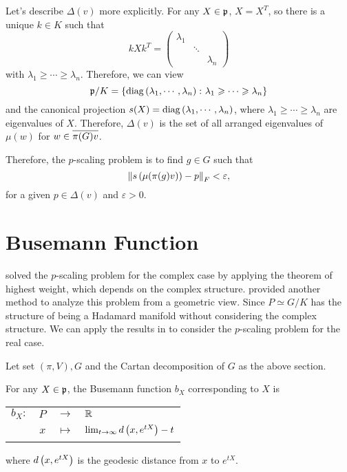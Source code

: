 \documentclass[suri,pdfbookmark]{engsuribt} %
\begin{document}
  Let's describe $\Delta(v)$ more explicitly. For any $X \in \mathfrak{p}$, $X = X^T$, so there is a unique $k \in K$ such that
  \begin{equation*}
    kXk^T = \left(
            \begin{array}{ccc}
              \lambda_1 & & \\
              & \ddots &\\
              &&\lambda_n
            \end{array}
          \right)
  \end{equation*}
  with $\lambda_1 \geqslant \cdots \geqslant \lambda_n$. Therefore, we can view
  \begin{equation*}
    \mathfrak{p}/K = \left\{\operatorname{diag}\left(\lambda_1, \cdots, \lambda_n\right) \colon \lambda_1 \geqslant \cdots \geqslant \lambda_n\right\}
  \end{equation*}
  and the canonical projection $s(X)= \operatorname{diag}\left(\lambda_1, \cdots, \lambda_n\right)$, where $\lambda_1 \geqslant \cdots \geqslant \lambda_n$ are eigenvalues of $X$. Therefore, $\Delta(v)$ is the set of all arranged eigenvalues of $\mu(w)$ for $w \in \overline{\pi(G)v}$.

  Therefore, the $p$-scaling problem is to find $g \in G$ such that
  \begin{equation*}
    \left\lVert s\left(\mu(\pi(g)v)\right)-p\right\lVert_{F} < \varepsilon,
  \end{equation*}
  for a given $p \in \Delta(v)$ and $\varepsilon > 0$.

  \section{Busemann Function}

  \cite{key8} solved the $p$-scaling problem for the complex case by applying the theorem of highest weight, which depends on the complex structure. \cite{key12} provided another method to analyze this problem from a geometric view. Since $P \simeq G/K$ has the structure of being a Hadamard manifold without considering the complex structure. We can apply the results in \cite{key12} to consider the $p$-scaling problem for the real case.

  Let set $(\pi,V),G$ and the Cartan decomposition of $G$ as the above section.

  \begin{defn}
    For any $X \in \mathfrak{p}$, the Busemann function $b_X$ corresponding to $X$ is
    \begin{center}
      \begin{tabular}{rrcl}
        $b_X \colon$ & $P$ & $\longrightarrow$ & $\mathbb{R}$\\
        ~ & $x$ & $\longmapsto$ & $\lim_{t \rightarrow \infty}d\left(x,e^{tX}\right)-t$
      \end{tabular}
    \end{center}
    where $d\left(x,e^{tX}\right)$ is the geodesic distance from $x$ to $e^{tX}$.
  \end{defn}
\end{document}
